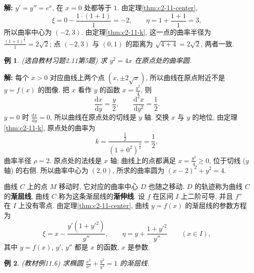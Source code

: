 \documentclass[UTF8,openany]{ctexbook}
\theoremstyle{chinesetextbook}
\newtheorem{example}{例}[section]
\newenvironment{cnsolution}{\par\indent\textbf{解:} \ignorespaces}{\par}
\newcommand{\dd}{\mathrm d}
\begin{document}
\begin{cnsolution}
$y'=y''=e^x$, 在 $x=0$ 处都等于 $1$. 由定理\ref{thm:c2-11-center},
\[
\xi=0-\frac{1\cdot(1+1)}1=-2,\qquad\eta=1+\frac{1+1}1=3,
\]
所以曲率中心为 $(-2,3)$. 由定理\ref{thm:c2-11-k}, 这一点的曲率半径为 $\displaystyle\frac{(1+1)^{\frac32}}1=2\sqrt2$; 点 $(-2,3)$ 与 $(0,1)$ 的距离为 $\sqrt{4+4}=2\sqrt2$, 两者一致.
\end{cnsolution}
\begin{example}\label{ex:c2-h11-5}
\textnormal{(选自教材习题2.11第5题)} 求 $y^2=4x$ 在原点处的曲率圆.
\end{example}
\begin{cnsolution}
每个 $x>0$ 对应曲线上两个点 $(x,\pm2\sqrt x)$, 所以曲线在原点附近不是 $y=f(x)$ 的图像. 把 $x$ 看作 $y$ 的函数 $\displaystyle x=\frac{y^2}4$, 则
\[
\frac{\dd x}{\dd y}=\frac y2,\qquad\frac{\dd^2x}{\dd y^2}=\frac12.
\]
$y=0$ 时 $\displaystyle\frac{\dd x}{\dd y}=0$, 所以曲线在原点处的切线是 $y$ 轴. 交换 $x$ 与 $y$ 的地位, 由定理\ref{thm:c2-11-k}, 原点处的曲率为
\[
k=\frac{\frac12}{(1+0^2)^{\frac32}}=\frac12,
\]
曲率半径 $\rho=2$. 原点处的法线是 $x$ 轴; 曲线上的点都满足 $\displaystyle x=\frac{y^2}4\ge0$, 位于切线 ($y$ 轴) 的右侧. 所以曲率中心为 $(2,0)$, 所求的曲率圆为 $(x-2)^2+y^2=4$.
\end{cnsolution}
曲线 $C$ 上的点 $M$ 移动时, 它对应的曲率中心 $D$ 也随之移动. $D$ 的轨迹称为曲线 $C$ 的\textbf{渐屈线}, 曲线 $C$ 称为这条渐屈线的\textbf{渐伸线}. 设 $f$ 在区间 $I$ 上二阶可导, 并且 $f''$ 在 $I$ 上没有零点. 由定理\ref{thm:c2-11-center}, 曲线 $y=f(x)$ 的渐屈线的参数方程为
\[
\xi=x-\frac{y'(1+y'^2)}{y''},\qquad\eta=y+\frac{1+y'^2}{y''}\qquad(x\in I),
\]
其中 $y=f(x)$, $y'$, $y''$ 都是 $x$ 的函数, $x$ 是参数.
\begin{example}\label{ex:c2-11-6}
\textnormal{(教材例11.6)} 求椭圆 $\displaystyle\frac{x^2}{a^2}+\frac{y^2}{b^2}=1$ 的渐屈线.
\end{example}
\end{document}
